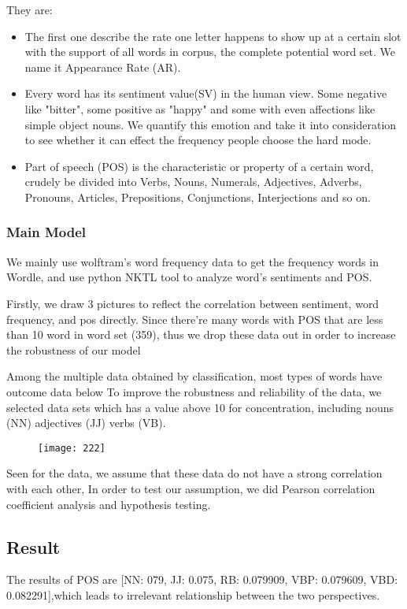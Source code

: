 \documentclass{mcmthesis}
\begin{document}
They are:
\begin{itemize}
\item The first one describe the rate one letter happens to show up at a certain slot with the support of all words in corpus, the complete potential word set. We name it Appearance Rate (AR). 
\item Every word has its sentiment value(SV) in the human view. Some negative like "bitter", some positive as "happy" and some with even affections like simple object nouns. We quantify this emotion and take it into consideration to see whether it can effect the frequency people choose the hard mode.
\item Part of speech (POS) is the characteristic or property of a certain word, crudely be divided into Verbs, Nouns, Numerals, Adjectives, Adverbs, Pronouns, Articles, Prepositions, Conjunctions, Interjections and so on.
\end{itemize}

\subsubsection{Main Model}

\hspace*{0.6cm}We mainly use wolftram’s word frequency data to get the frequency words in Wordle, and use python NKTL tool to analyze word’s sentiments and POS.

Firstly, we draw 3 pictures to reflect the correlation between sentiment, word frequency, and pos directly. Since there’re many words with POS that are less than 10 word in word set (359), thus we drop these data out in order to increase the robustness of our model

Among the multiple data obtained by classification, most types of words have outcome data below To improve the robustness and reliability of the data, we selected data sets which has a value above 10 for concentration, including nouns (NN) adjectives (JJ) verbs (VB).


\begin{figure}[h]
\small
\centering
\texttt{[image: 222]}
\caption{} \label{fig:aa}
\end{figure}

Seen for the data, we assume that these data do not have a strong correlation with each other, In order to test our assumption, we did Pearson correlation coefficient analysis and hypothesis testing. 

\subsection{Result}
\hspace*{0.6cm}The results of POS are [NN: 079, JJ: 0.075, RB: 0.079909, VBP: 0.079609, VBD: 0.082291],which leads to irrelevant relationship between the two perspectives.
\end{document}
